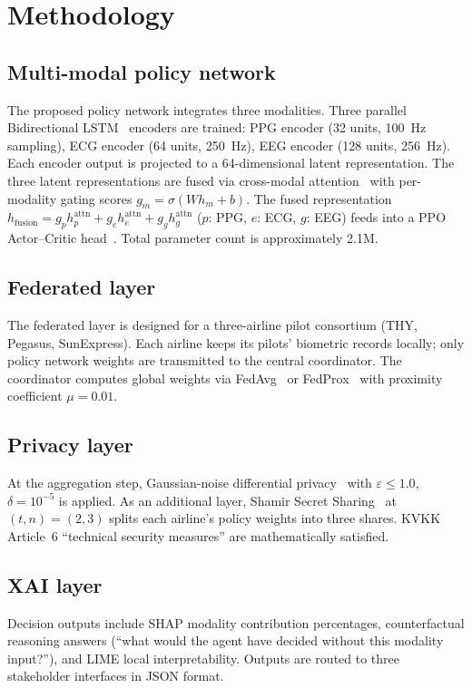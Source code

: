 \documentclass[11pt]{article}
\begin{document}
\section{Methodology}
\subsection{Multi-modal policy network}
The proposed policy network integrates three modalities. Three parallel Bidirectional LSTM~\cite{lstm} encoders are trained: PPG encoder (32 units, 100~Hz sampling), ECG encoder (64 units, 250~Hz), EEG encoder (128 units, 256~Hz). Each encoder output is projected to a 64-dimensional latent representation. The three latent representations are fused via cross-modal attention~\cite{vaswani2017} with per-modality gating scores $g_m = \sigma(W h_m + b)$. The fused representation $h_{\mathrm{fusion}} = g_p h_p^{\mathrm{attn}} + g_e h_e^{\mathrm{attn}} + g_g h_g^{\mathrm{attn}}$ ($p$: PPG, $e$: ECG, $g$: EEG) feeds into a PPO Actor--Critic head~\cite{schulman2017, sutton2018}. Total parameter count is approximately 2.1M.

\subsection{Federated layer}
The federated layer is designed for a three-airline pilot consortium (THY, Pegasus, SunExpress). Each airline keeps its pilots' biometric records locally; only policy network weights are transmitted to the central coordinator. The coordinator computes global weights via FedAvg~\cite{mcmahan2017} or FedProx~\cite{li2020} with proximity coefficient $\mu = 0.01$.

\subsection{Privacy layer}
At the aggregation step, Gaussian-noise differential privacy~\cite{dwork2014} with $\varepsilon \le 1.0$, $\delta = 10^{-5}$ is applied. As an additional layer, Shamir Secret Sharing~\cite{shamir1979} at $(t,n)=(2,3)$ splits each airline's policy weights into three shares. KVKK Article~6 ``technical security measures'' are mathematically satisfied.

\subsection{XAI layer}
Decision outputs include SHAP modality contribution percentages, counterfactual reasoning answers (``what would the agent have decided without this modality input?''), and LIME local interpretability. Outputs are routed to three stakeholder interfaces in JSON format.
\end{document}
